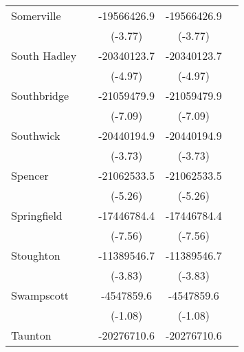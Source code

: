 {\begin{tabular}{l*{4}{c}}
\addlinespace
Somerville          &                     & -19566426.9\sym{***}& -19566426.9\sym{***}&                     \\
                    &                     &     (-3.77)         &     (-3.77)         &                     \\
\addlinespace
South Hadley        &                     & -20340123.7\sym{***}& -20340123.7\sym{***}&                     \\
                    &                     &     (-4.97)         &     (-4.97)         &                     \\
\addlinespace
Southbridge         &                     & -21059479.9\sym{***}& -21059479.9\sym{***}&                     \\
                    &                     &     (-7.09)         &     (-7.09)         &                     \\
\addlinespace
Southwick           &                     & -20440194.9\sym{***}& -20440194.9\sym{***}&                     \\
                    &                     &     (-3.73)         &     (-3.73)         &                     \\
\addlinespace
Spencer             &                     & -21062533.5\sym{***}& -21062533.5\sym{***}&                     \\
                    &                     &     (-5.26)         &     (-5.26)         &                     \\
\addlinespace
Springfield         &                     & -17446784.4\sym{***}& -17446784.4\sym{***}&                     \\
                    &                     &     (-7.56)         &     (-7.56)         &                     \\
\addlinespace
Stoughton           &                     & -11389546.7\sym{***}& -11389546.7\sym{***}&                     \\
                    &                     &     (-3.83)         &     (-3.83)         &                     \\
\addlinespace
Swampscott          &                     &  -4547859.6         &  -4547859.6         &                     \\
                    &                     &     (-1.08)         &     (-1.08)         &                     \\
\addlinespace
Taunton             &                     & -20276710.6\sym{***}& -20276710.6\sym{***}&                     \\

\end{tabular}}
